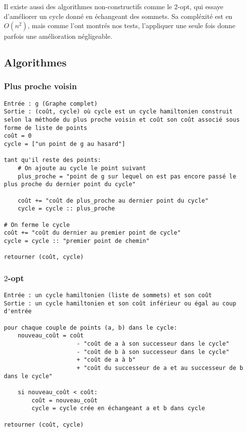 \documentclass{scrartcl}
\begin{document}
    Il existe aussi des algorithmes non-constructifs comme le 2-opt, qui essaye
    d'améliorer un cycle donné en échangeant des sommets. Sa compléxité est en
    $O(n^2)$, mais comme l'ont montrés nos tests, l'appliquer une seule fois
    donne parfois une amélioration négligeable.

  \subsection{Algorithmes}
    \subsubsection{Plus proche voisin}
      \begin{lstlisting}
Entrée : g (Graphe complet)
Sortie : (coût, cycle) où cycle est un cycle hamiltonien construit selon la méthode du plus proche voisin et coût son coût associé sous forme de liste de points
coût = 0
cycle = ["un point de g au hasard"]

tant qu'il reste des points:
    # On ajoute au cycle le point suivant
    plus_proche = "point de g sur lequel on est pas encore passé le plus proche du dernier point du cycle"

    coût += "coût de plus_proche au dernier point du cycle"
    cycle = cycle :: plus_proche

# On ferme le cycle
coût += "coût du dernier au premier point de cycle"
cycle = cycle :: "premier point de chemin"

retourner (coût, cycle)
      \end{lstlisting}

    \subsubsection{$2$-opt}
      \begin{lstlisting}
Entrée : un cycle hamiltonien (liste de sommets) et son coût
Sortie : un cycle hamiltonien et son coût inférieur ou égal au coup d'entrée

pour chaque couple de points (a, b) dans le cycle:
    nouveau_coût = coût
                     - "coût de a à son successeur dans le cycle"
                     - "coût de b à son successeur dans le cycle"
                     + "coût de a à b"
                     + "coût du successeur de a et au successeur de b dans le cycle"

    si nouveau_coût < coût:
        coût = nouveau_coût
        cycle = cycle crée en échangeant a et b dans cycle

retourner (coût, cycle)
      \end{lstlisting}
\end{document}
